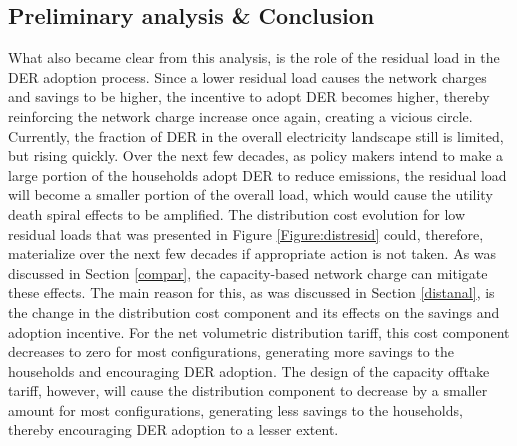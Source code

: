 \subsection{Preliminary analysis \& Conclusion}
What also became clear from this analysis, is the role of the residual load in the DER adoption process. Since a lower residual load causes the network charges and savings to be higher, the incentive to adopt DER becomes higher, thereby reinforcing the network charge increase once again, creating a vicious circle. Currently, the fraction of DER in the overall electricity landscape still is limited, but rising quickly. Over the next few decades, as policy makers intend to make a large portion of the households adopt DER to reduce emissions, the residual load will become a smaller portion of the overall load, which would cause the utility death spiral effects to be amplified. The distribution cost evolution for low residual loads that was presented in Figure \ref{Figure:distresid} could, therefore, materialize over the next few decades if appropriate action is not taken. As was discussed in Section \ref{compar}, the capacity-based network charge can mitigate these effects. The main reason for this, as was discussed in Section \ref{distanal}, is the change in the distribution cost component and its effects on the savings and adoption incentive. For the net volumetric distribution tariff, this cost component decreases to zero for most configurations, generating more savings to the households and encouraging DER adoption. The design of the capacity offtake tariff, however, will cause the distribution component to decrease by a smaller amount for most configurations, generating less savings to the households, thereby encouraging DER adoption to a lesser extent. 

